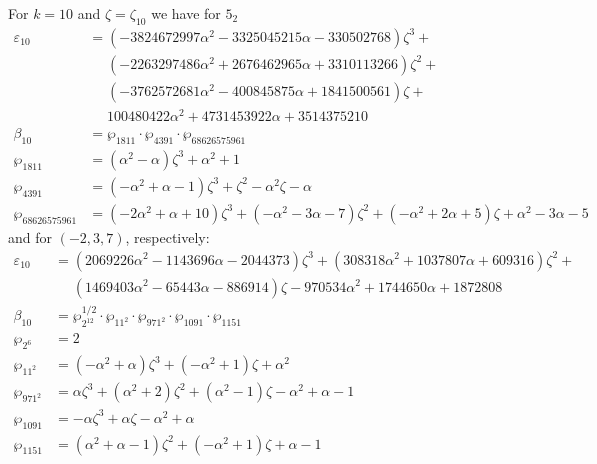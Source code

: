 \documentclass[12pt]{amsart}
\theoremstyle{definition}
\def\a{\alpha}
\def\z{\zeta}
\def\z{\zeta}
\begin{document}
\noindent 
For $k=10$ and $\zeta=\zeta_{10}$ we have for $5_2$
{\small
\begin{align*}
\varepsilon_{10} &= 
(-3824672997 \a^2 - 3325045215 \a - 330502768) \z^3 + 
\\ & \quad\,\,
(-2263297486 \a^2 + 2676462965 \a + 3310113266) \z^2 + 
\\ & \quad\,\,
(-3762572681 \a^2 - 400845875 \a + 1841500561) \z + 
\\ & \quad\,\,
100480422 \a^2 + 4731453922 \a + 3514375210
\\
\beta_{10} &= \wp_{1811} \cdot \wp_{4391} \cdot \wp_{68626575961} \\
\wp_{1811} &= (\a^2 - \a) \z^3 + \a^2 + 1
\\
\wp_{4391} &= (-\a^2 + \a - 1) \z^3 + \z^2 - \a^2 \z - \a
\\
\wp_{68626575961} &=
(-2 \a^2 + \a + 10) \z^3 + (-\a^2 - 3 \a - 7) \z^2 + (-\a^2 + 2 \a + 5) \z + \a^2 - 3 \a - 5
\end{align*}
}
and for $(-2,3,7)$, respectively:
{\small
\begin{align*}
\varepsilon_{10} &= 
(2069226 \a^2 - 1143696 \a - 2044373) \z^3 + (308318 \a^2 + 1037807 \a + 609316) \z^2 + 
\\ & \quad\,\,
(1469403 \a^2 - 65443 \a - 886914) \z - 970534 \a^2 + 1744650 \a + 1872808
\\
\beta_{10} &= \wp_{2^{12}}^{1/2} \cdot \wp_{11^2} \cdot \wp_{971^2}
\cdot \wp_{1091} \cdot \wp_{1151} \\
\wp_{2^{6}} &= 2
\\
\wp_{11^2} &= (-\a^2 + \a) \z^3 + (-\a^2 + 1) \z + \a^2
\\
\wp_{971^2} &= \a \z^3 + (\a^2 + 2) \z^2 + (\a^2 - 1) \z - \a^2 + \a - 1
\\
\wp_{1091} &= -\a \z^3 + \a \z - \a^2 + \a
\\
\wp_{1151} &= (\a^2 + \a - 1) \z^2 + (-\a^2 + 1) \z + \a - 1
\end{align*}
}
\end{document}
